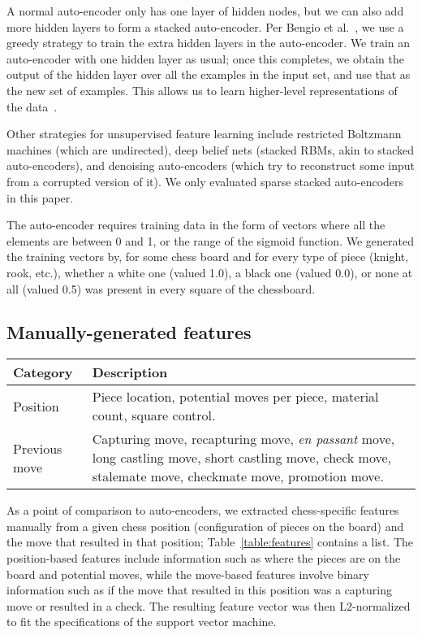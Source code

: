 \documentclass[11pt]{article}
\begin{document}
A normal auto-encoder only has one layer of hidden nodes, but we can also add more hidden layers to form a stacked auto-encoder. Per Bengio et al.~, we use a greedy strategy to train the extra hidden layers in the auto-encoder. We train an auto-encoder with one hidden layer as usual; once this completes, we obtain the output of the hidden layer over all the examples in the input set, and use that as the new set of examples. This allows us to learn higher-level representations of the data~\cite{Vincent}.

Other strategies for unsupervised feature learning include restricted Boltzmann machines (which are undirected), deep belief nets (stacked RBMs, akin to stacked auto-encoders), and denoising auto-encoders (which try to reconstruct some input from a corrupted version of it). We only evaluated sparse stacked auto-encoders in this paper.

The auto-encoder requires training data in the form of vectors where all the elements are between 0 and 1, or the range of the sigmoid function. We generated the training vectors by, for some chess board and for every type of piece (knight, rook, etc.), whether a white one (valued 1.0), a black one (valued 0.0), or none at all (valued 0.5) was present in every square of the chessboard.

\subsection{Manually-generated features}
\begin{table*}
\centering
\begin{tabular}{lp{}}
\hline
\textbf{Category} & \textbf{Description} \\ \hline
Position & Piece location, potential moves per piece, material count, square control. \\
Previous move & Capturing move, recapturing move, \emph{en passant} move, long castling move, short castling move, check move, stalemate move, checkmate move, promotion move. \\
\hline
\end{tabular} 
\caption{List of chess-specific manual features per position.}
\label{table:features}
\end{table*}

As a point of comparison to auto-encoders, we extracted chess-specific features manually from a given chess position (configuration of pieces on the board) and the move that resulted in that position; Table~\ref{table:features} contains a list. The position-based features include information such as where the pieces are on the board and potential moves, while the move-based features involve binary information such as if the move that resulted in this position was a capturing move or resulted in a check.  The resulting feature vector was then L2-normalized to fit the specifications of the support vector machine.
\end{document}
